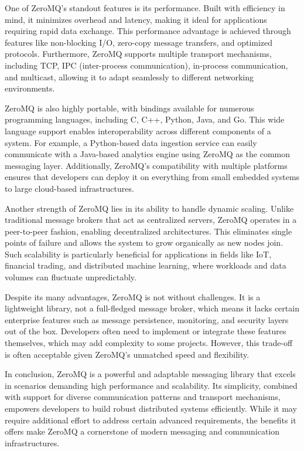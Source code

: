 One of ZeroMQ's standout features is its performance. Built with efficiency in mind, it minimizes overhead and latency, making it ideal for applications requiring rapid data exchange. This performance advantage is achieved through features like non-blocking I/O, zero-copy message transfers, and optimized protocols. Furthermore, ZeroMQ supports multiple transport mechanisms, including TCP, IPC (inter-process communication), in-process communication, and multicast, allowing it to adapt seamlessly to different networking environments.

ZeroMQ is also highly portable, with bindings available for numerous programming languages, including C, C++, Python, Java, and Go. This wide language support enables interoperability across different components of a system. For example, a Python-based data ingestion service can easily communicate with a Java-based analytics engine using ZeroMQ as the common messaging layer. Additionally, ZeroMQ's compatibility with multiple platforms ensures that developers can deploy it on everything from small embedded systems to large cloud-based infrastructures.

Another strength of ZeroMQ lies in its ability to handle dynamic scaling. Unlike traditional message brokers that act as centralized servers, ZeroMQ operates in a peer-to-peer fashion, enabling decentralized architectures. This eliminates single points of failure and allows the system to grow organically as new nodes join. Such scalability is particularly beneficial for applications in fields like IoT, financial trading, and distributed machine learning, where workloads and data volumes can fluctuate unpredictably.

Despite its many advantages, ZeroMQ is not without challenges. It is a lightweight library, not a full-fledged message broker, which means it lacks certain enterprise features such as message persistence, monitoring, and security layers out of the box. Developers often need to implement or integrate these features themselves, which may add complexity to some projects. However, this trade-off is often acceptable given ZeroMQ's unmatched speed and flexibility.

In conclusion, ZeroMQ is a powerful and adaptable messaging library that excels in scenarios demanding high performance and scalability. Its simplicity, combined with support for diverse communication patterns and transport mechanisms, empowers developers to build robust distributed systems efficiently. While it may require additional effort to address certain advanced requirements, the benefits it offers make ZeroMQ a cornerstone of modern messaging and communication infrastructures.
